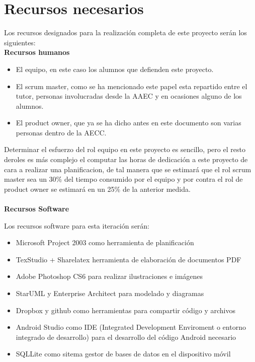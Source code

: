 \documentclass[../pfc.tex]{subfiles}
\begin{document}
	
	\section{Recursos necesarios}
	Los recursos designados para la realización completa de este proyecto serán los siguientes:\\
	
	\textbf{Recursos humanos}
	
	\begin{itemize} 
		\item El equipo, en este caso los alumnos que defienden este proyecto. 
		\item El scrum master, como se ha mencionado este papel esta repartido entre el tutor, personas involucradas desde la AAEC y en ocasiones alguno de los alumnos. 
		\item El product owner, que ya se ha dicho antes en este documento son varias personas dentro de la AECC. 
	\end{itemize}
	
	Determinar el esfuerzo del rol equipo en este proyecto es sencillo, pero el resto deroles es más complejo el computar las horas de dedicación a este proyecto de cara a realizar una planificacion, de tal manera que se estimará que el rol scrum master sea un 30\% del tiempo consumido por el equipo y por contra el rol de product owner se estimará en un 25\% de la anterior medida.\\\\
	
	\textbf{Recursos Software}
	
	Los recursos software para esta iteración serán:
	\begin{itemize}
		\item Microsoft Project 2003 como herramienta de planificación
		\item TexStudio + Sharelatex herramienta de elaboración de documentos PDF
		\item Adobe Photoshop CS6 para realizar ilustraciones e imágenes
		\item StarUML y Enterprise Architect para modelado y diagramas
		\item Dropbox y github como herramientas para compartir código y archivos
		\item Android Studio como IDE (Integrated Development Enviroment o entorno integrado de desarrollo) para el desarrollo del código Android necesario
		\item SQLLite como sitema gestor de bases de datos en el dispositivo móvil\\\\
	\end{itemize}
	
\end{document}
